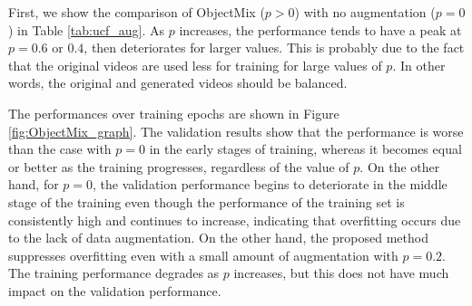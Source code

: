 \begin{table}[t]

\centering

\caption{The top-1 performance of ObjectMix (OM) on UCF101 and HMDB51 validation set.
The $p=0.0$ is the baseline without applying the proposed method.
}
\label{tab:ucf_aug}
\label{tab:hmdb_aug}







\end{table}







First, we show the comparison of ObjectMix ($p>0$) with no augmentation ($p=0$)
in Table \ref{tab:ucf_aug}.
As $p$ increases, the performance tends to have a peak at $p=0.6$ or $0.4$,
then deteriorates for larger values.
This is probably due to the fact that
the original videos are used less for training for large values of $p$.
In other words, the original and generated videos should be balanced.


The performances over training epochs are shown in Figure \ref{fig:ObjectMix_graph}.
The validation results show that the performance is worse than the case with $p=0$ in the early stages of training, whereas it becomes equal or better as the training progresses, regardless of the value of $p$.
On the other hand, for $p=0$, the validation performance begins to deteriorate in the middle stage of the training even though the performance of the training set is consistently high and continues to increase,
indicating that overfitting occurs due to the lack of data augmentation.
On the other hand, the proposed method suppresses overfitting even with a small amount of augmentation with $p=0.2$.
The training performance degrades as $p$ increases, but this does not have much impact on the validation performance.




